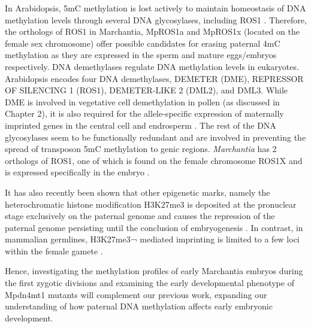 In Arabidopsis, 5mC methylation is lost actively to maintain homeostasis of DNA methylation levels through several DNA glycosylases, including ROS1 \citep{RN168}. Therefore, the orthologs of ROS1 in Marchantia, MpROS1a and MpROS1x (located on the female sex chromosome) offer possible candidates for erasing paternal 4mC methylation as they are expressed in the sperm \citep{RN212} and mature eggs/embryos \citep{RN257} respectively.
DNA demethylases regulate DNA methylation levels in eukaryotes. Arabidopsis encodes four DNA demethylases, DEMETER (DME), REPRESSOR OF SILENCING 1 (ROS1), DEMETER-LIKE 2 (DML2), and DML3. While DME is involved in vegetative cell demethylation in pollen \citep{RN57} (as discussed in Chapter 2), it is also required for the allele-specific expression of maternally imprinted genes in the central cell and endrosperm \citep{RN235}. The rest of the DNA glycosylases seem to be functionally redundant and are involved in preventing the spread of transposon 5mC methylation to genic regions\citep{RN288}. \textit{Marchantia} has 2 orthologs of ROS1, one of which is found on the female chromosome ROS1X and is expressed specifically in the embryo \citep{RN169,RN257,RN189}. 

It has also recently been shown that other epigenetic marks, namely the heterochromatic histone modification H3K27me3 is deposited at the pronuclear stage exclusively on the paternal genome and causes the repression of the paternal genome persisting until the conclusion of embryogenesis \citep{RN160}. In contrast, in mammalian germlines, H3K27me3¬ mediated imprinting is limited to a few loci within the female gamete \citep{RN172}.

Hence, investigating the methylation profiles of early Marchantia embryos during the first zygotic divisions and examining the early developmental phenotype of Mpdn4mt1 mutants will complement our previous work, expanding our understanding of how paternal DNA methylation affects early embryonic development.

